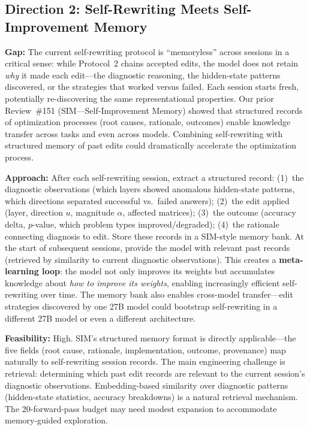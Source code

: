 \documentclass[11pt,a4paper]{article}
\begin{document}
\subsection{Direction 2: Self-Rewriting Meets Self-Improvement Memory}
\textbf{Gap:} The current self-rewriting protocol is ``memoryless'' across sessions in a critical sense: while Protocol~2 chains accepted edits, the model does not retain \emph{why} it made each edit---the diagnostic reasoning, the hidden-state patterns discovered, or the strategies that worked versus failed. Each session starts fresh, potentially re-discovering the same representational properties. Our prior Review~\#151 (SIM---Self-Improvement Memory) showed that structured records of optimization processes (root causes, rationale, outcomes) enable knowledge transfer across tasks and even across models. Combining self-rewriting with structured memory of past edits could dramatically accelerate the optimization process.

\textbf{Approach:} After each self-rewriting session, extract a structured record: (1)~the diagnostic observations (which layers showed anomalous hidden-state patterns, which directions separated successful vs.\ failed answers); (2)~the edit applied (layer, direction $u$, magnitude $\alpha$, affected matrices); (3)~the outcome (accuracy delta, $p$-value, which problem types improved/degraded); (4)~the rationale connecting diagnosis to edit. Store these records in a SIM-style memory bank. At the start of subsequent sessions, provide the model with relevant past records (retrieved by similarity to current diagnostic observations). This creates a \textbf{meta-learning loop}: the model not only improves its weights but accumulates knowledge about \emph{how to improve its weights}, enabling increasingly efficient self-rewriting over time. The memory bank also enables cross-model transfer---edit strategies discovered by one 27B model could bootstrap self-rewriting in a different 27B model or even a different architecture.

\textbf{Feasibility:} High. SIM's structured memory format is directly applicable---the five fields (root cause, rationale, implementation, outcome, provenance) map naturally to self-rewriting session records. The main engineering challenge is retrieval: determining which past edit records are relevant to the current session's diagnostic observations. Embedding-based similarity over diagnostic patterns (hidden-state statistics, accuracy breakdowns) is a natural retrieval mechanism. The 20-forward-pass budget may need modest expansion to accommodate memory-guided exploration.
\end{document}
